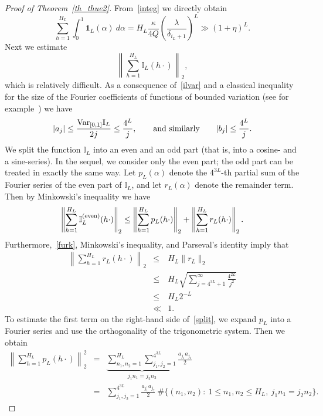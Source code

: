 \documentclass[12pt]{amsart}
\begin{document}
\begin{proof}[Proof of Theorem~\ref{th_thue2}]
From~\eqref{integ} we directly obtain
\begin{equation} \label{summe}
\sum_{h=1}^{H_L} \int_0^1 \mathbf{1}_L (\alpha) ~d \alpha = H_L \frac{\kappa}{4 Q} \left(\frac{\lambda}{\delta_{i_{L}+1}}\right)^{L} \gg (1+\eta)^L.
\end{equation}
Next we estimate 
$$
\left\| \sum_{h=1}^{H_L} \mathbb{I}_L (h \cdot) \right\|_2,
$$
which is relatively difficult. As a consequence of~\eqref{ilvar} and a classical inequality for the size of the Fourier coefficients of functions of bounded variation (see for example~\cite[p. 48]{zyg}) we have
\begin{equation} \label{furk}
|a_j| \leq \frac{\textup{Var}_{[0,1]} \mathbb{I}_L}{2j} \leq \frac{4^L}{j}, \qquad \textrm{and similarly} \qquad |b_j| \leq \frac{4^L}{j}.
\end{equation}
We split the function $\mathbb{I}_L$ into an even and an odd part (that is, into a cosine- and a sine-series). In the sequel, we consider only the even part; the odd part can be treated in exactly the same way. Let $p_L(\alpha)$ denote the $4^{3L}$-th partial sum of the Fourier series of the even part of $\mathbb{I}_L$, and let $r_L(\alpha)$ denote the remainder term. Then by Minkowski's inequality we have
\begin{equation} \label{split}
\left\| \sum_{h=1}^{H_L} \mathbb{I}_L^{(\textup{even})} (h \cdot) \right\|_2 \leq \left\| \sum_{h=1}^{H_L} p_L (h \cdot) \right\|_2 + \left\| \sum_{h=1}^{H_L} r_L (h \cdot) \right\|_2.
\end{equation}
Furthermore,~\eqref{furk}, Minkowski's inequality, and Parseval's identity imply that
\begin{eqnarray}
\left\|\sum_{h=1}^{H_L} r_L (h \cdot) \right\|_2 & \leq & H_L \|r_L\|_2 \nonumber\\
& \leq & H_L \sqrt{\sum_{j=4^{3L} + 1}^\infty \frac{4^{2L}}{j^2}} \nonumber\\
& \leq & H_L 2^{-L} \nonumber\\
& \ll & 1. \label{split2}
\end{eqnarray}
To estimate the first term on the right-hand side of~\eqref{split}, we expand $p_L$ into a Fourier series and use the orthogonality of the trigonometric system. Then we obtain
\begin{eqnarray}
\left\| \sum_{h=1}^{H_L} p_L (h \cdot) \right\|_2^2 & = & \underbrace{\sum_{n_1,n_2=1}^{H_L} \sum_{j_1,j_2=1}^{4^{3L}}}_{j_1 n_1 = j_2 n_2} \frac{a_{j_1} a_{j_2}}{2}  \nonumber\\
& = &  \sum_{j_1,j_2=1}^{4^{3L}} \frac{a_{j_1} a_{j_2}}{2} ~\# \Big\{ (n_1, n_2):~1 \leq n_1, n_2 \leq H_L, ~j_1 n_1 = j_2 n_2 \Big\}. \label{rhssum}

\end{eqnarray}
\end{proof}
\end{document}
